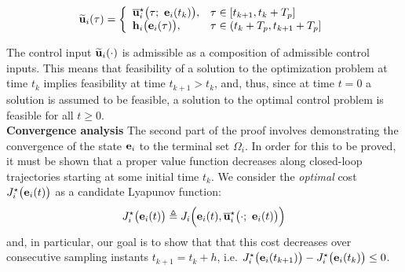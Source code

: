 \begin{equation}
  \widetilde{\bm{\mathbf{u}}}_i(\tau) = \left\{
      \begin{array}{ll}
        \overline{\bm{\mathbf{u}}}_i^{\star}\big(\tau;\ \bm{\mathbf{e}}_i(t_k)\big), & \tau \in [t_{k+1}, t_k + T_p] \\
        \bm{\mathbf{h}}_i\big(\bm{\mathbf{e}}_i(\tau)\big), & \tau \in (t_k + T_p, t_{k+1} + T_p]
      \end{array}
      \right.
\label{eq:optimal_input_t_plus_one}
\end{equation}

The control input $\widetilde{\bm{\mathbf{u}}}_i(\cdot)$ is admissible as a
composition of admissible control inputs. This means that feasibility of a
solution to the optimization problem at time $t_k$ implies feasibility at
time $t_{k+1} > t_k$, and, thus, since at time $t=0$ a solution is assumed to
be feasible, a solution to the optimal control problem is feasible for all
$t \geq 0$.\\

\textbf{Convergence analysis}
The second part of the proof involves demonstrating the convergence of the
state $\bm{\mathbf{e}}_i$ to the terminal set $\Omega_i$. In order for this
to be proved, it must be shown that a proper value function decreases along
closed-loop trajectories starting at some initial time $t_k$. We consider the
\textit{optimal} cost $J_i^{\star}\big(\bm{\mathbf{e}}_i(t)\big)$ as a candidate
Lyapunov function:
$$J_i^{\star}\big(\vect{e}_i(t)\big) \triangleq J_i \Big(\vect{e}_i(t), \overline{\vect{u}}_i^{\star}\big(\cdot;\ \vect{e}_i(t)\big)\Big)$$
and, in particular, our goal is to show that that this cost decreases over
consecutive sampling instants $t_{k+1} = t_k + h$, i.e.
$J_i^{\star}\big(\bm{\mathbf{e}}_i(t_{k+1})\big) - J_i^{\star}\big(\bm{\mathbf{e}}_i(t_k)\big) \leq 0$.\\


